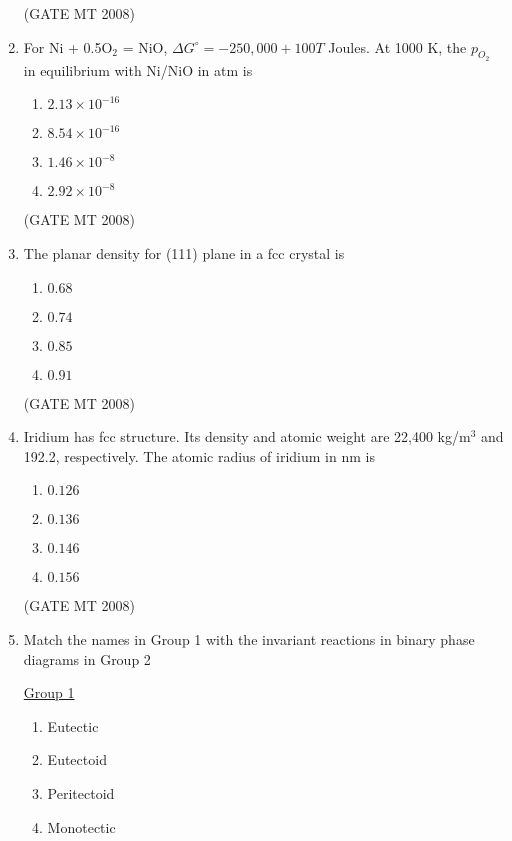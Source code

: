 \documentclass[11pt, letterpaper]{article}
\theoremstyle{remark}
\begin{document}
\begin{enumerate}
\hfill(GATE MT 2008) 
\item For Ni + 0.5O$_2$ = NiO, $\Delta G^\circ = -250,000 + 100T$ Joules. At 1000 K, the $p_{O_2}$ in equilibrium with Ni/NiO in atm is 

\begin{multicols}{4}
\begin{enumerate}
\item $2.13 \times 10^{-16}$
\item $8.54 \times 10^{-16}$
\item $1.46 \times 10^{-8}$
\item $2.92 \times 10^{-8}$
\end{enumerate}
\end{multicols}

\hfill(GATE MT 2008) 
\item The planar density for (111) plane in a fcc crystal is 

\begin{multicols}{4}
\begin{enumerate}
\item $0.68$
\item $0.74$ 
\item $0.85$ 
\item $0.91$
\end{enumerate}
\end{multicols}

\hfill(GATE MT 2008)

\item Iridium has fcc structure. Its density and atomic weight are 22,400 kg/m$^3$ and 192.2, respectively. The atomic radius of iridium in nm is

\begin{multicols}{4}
\begin{enumerate}
\item $0.126$ 
\item $0.136$ 
\item $0.146$ 
\item $0.156$
\end{enumerate}
\end{multicols}

\hfill(GATE MT 2008) 

\item Match the names in Group 1 with the invariant reactions in binary phase diagrams in Group 2
\begin{multicols}{2}
\underline{Group 1}
\begin{enumerate}
\item Eutectic
\item Eutectoid 
\item Peritectoid
\item Monotectic
\end{enumerate}


\end{multicols}
\end{enumerate}
\end{document}
